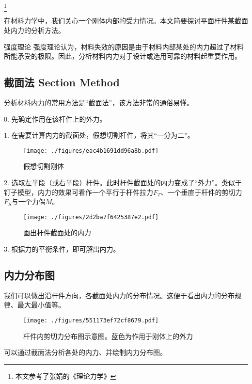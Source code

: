 
\footnote{本文参考了张娟的《理论力学》}

在材料力学中，我们关心一个刚体内部的受力情况。本文简要探讨平面杆件某截面处内力的分析方法。

\begin{example}{强度理论}
强度理论认为，材料失效的原因是由于材料内部某处的内力超过了材料所能承受的极限。因此，分析材料内力对于设计或选用可靠的材料起重要作用。
\end{example}

\subsection{截面法 Section Method}
分析材料内力的常用方法是“截面法”，该方法非常的通俗易懂。

0. 先确定作用在该杆件上的外力。

1. 在需要计算内力的截面处，假想切割杆件，将其“一分为二”。
\begin{figure}[ht]
\centering
\texttt{[image: ./figures/eac4b1691dd96a8b.pdf]}
\caption{假想切割刚体} \label{fig_INTFRC_1}
\end{figure}

2. 选取左半段（或右半段）杆件。此时杆件截面处的内力变成了“外力”。类似于钉子模型，内力的效果可看作一个平行于杆件拉力$F_T$、一个垂直于杆件的剪切力$F_S$与一个力偶$M$。
\begin{figure}[ht]
\centering
\texttt{[image: ./figures/2d2ba7f6425387e2.pdf]}
\caption{画出杆件截面处的内力} \label{fig_INTFRC_2}
\end{figure}

3. 根据力的平衡条件，即可解出内力。

\subsection{内力分布图}
我们可以做出沿杆件方向，各截面处内力的分布情况。这便于看出内力的分布规律、最大最小值等。
\begin{figure}[ht]
\centering
\texttt{[image: ./figures/551173ef72cf8679.pdf]}
\caption{杆件内剪切力分布图示意图。蓝色为作用于刚体上的外力} \label{fig_INTFRC_3}
\end{figure}

可以通过截面法分析各处的内力、并绘制内力分布图。

